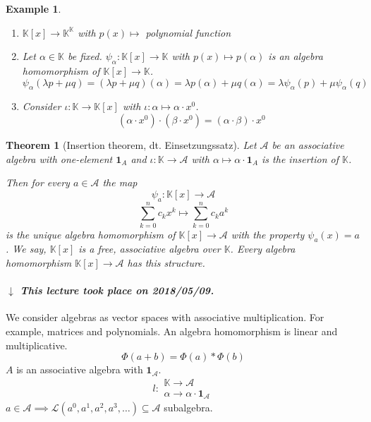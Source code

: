 \documentclass[a4paper]{article}
\newcounter{lecref}[section]
\numberwithin{lecref}{section}
\newtheorem{theorem}[lecref]{Theorem}
\newtheorem{example}[lecref]{Example}
\newcommand{\dateref}[1]{%
  \begin{mdframed}[backgroundcolor=gray!10,innerbottommargin=0pt,innertopmargin=0pt]
    \paragraph{\textit{$\downarrow$ This lecture took place on #1.}}%
  \end{mdframed}%
}
\begin{document}
\begin{example} %
  \begin{enumerate}
    \item $\mathbb K[x] \to \mathbb K^{\mathbb K}$ with $p(x) \mapsto$ polynomial function
    \item
      Let $\alpha \in \mathbb K$ be fixed.
      $\psi_{\alpha}: \mathbb K[x] \to \mathbb K$ with $p(x) \mapsto p(\alpha)$ is an algebra homomorphism of $\mathbb K[x] \to \mathbb K$.
      \[ \psi_\alpha(\lambda p + \mu q) = (\lambda p + \mu q)(\alpha) = \lambda p(\alpha) + \mu q(\alpha) = \lambda \psi_{\alpha}(p) + \mu \psi_{\alpha}(q) \]
    \item Consider $\iota: \mathbb K \to \mathbb K[x]$ with $\iota: \alpha \mapsto \alpha \cdot x^0$.
      \[ (\alpha \cdot x^0) \cdot (\beta \cdot x^0) = (\alpha \cdot \beta) \cdot x^0 \]
  \end{enumerate}
\end{example}

\begin{theorem}[Insertion theorem, dt. \foreignlanguage{german}{Einsetzungssatz}] %
  Let $\mathcal A$ be an associative algebra with one-element $\mathbf 1_A$
  and $\iota: \mathbb K \to \mathcal A$ with $\alpha \mapsto \alpha \cdot \mathbf 1_A$ is the insertion of $\mathbb K$.

  Then for every $a \in \mathcal A$ the map
  \[ \psi_a: \mathbb K[x] \to \mathcal A \]
  \[ \sum_{k=0}^n c_k x^k \mapsto \sum_{k=0}^n c_k a^k \]
  is the unique algebra homomorphism of $\mathbb K[x] \to \mathcal A$ with the property $\psi_a(x) = a$.
  We say, $\mathbb K[x]$ is a \emph{free, associative algebra over $\mathbb K$}.
  Every algebra homomorphism $\mathbb K[x] \to \mathcal A$ has this structure.
\end{theorem}

\dateref{2018/05/09}

We consider algebras as vector spaces with associative multiplication. For example, matrices and polynomials.
An algebra homomorphism is linear and multiplicative.
\[ \Phi(a + b)= \Phi(a) * \Phi(b) \]
$A$ is an associative algebra with $\mathbf 1_{\mathcal A}$.
\[ l: \begin{array}{cc} \mathbb K \to \mathcal A \\ \alpha \to \alpha \cdot \mathbf 1_{\mathcal A} \end{array} \]
$a \in \mathcal A \implies \mathcal L(a^0, a^1, a^2, a^3, \dots) \subseteq \mathcal A$ subalgebra.
\end{document}
